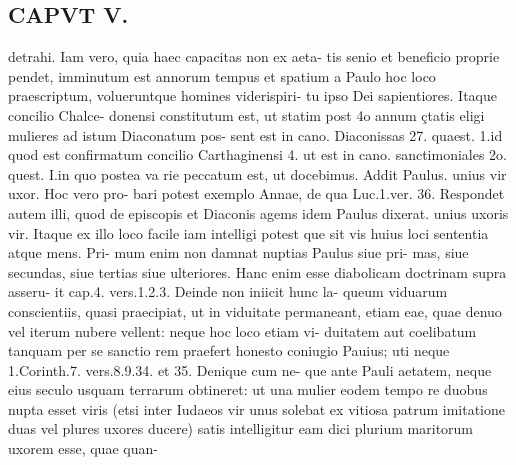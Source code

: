 \documentclass{article}
\begin{document}
\begin{pages}
\section*{CAPVT  V. }
\marginpar{[ p.27 ]}detrahi. Iam vero, quia haec capacitas non ex aeta- tis senio et beneficio proprie pendet, imminutum est annorum tempus et spatium a Paulo hoc loco praescriptum, volueruntque homines viderispiri- tu ipso Dei sapientiores. Itaque concilio Chalce- donensi constitutum est, ut statim post 4o annum çtatis eligi mulieres ad istum Diaconatum pos- sent est in cano. Diaconissas 27. quaest. 1.id quod est confirmatum concilio Carthaginensi 4. ut est in cano. sanctimoniales 2o. quest. I.in quo postea va rie peccatum est, ut docebimus. Addit Paulus. unius vir uxor. Hoc vero pro- bari potest exemplo Annae, de qua Luc.1.ver. 36. Respondet autem illi, quod de episcopis et Diaconis agems idem Paulus dixerat. unius uxoris vir. Itaque ex illo loco facile iam intelligi potest que sit vis huius loci sententia atque mens. Pri- mum enim non damnat nuptias Paulus siue pri- mas, siue secundas, siue tertias siue ulteriores. Hanc enim esse diabolicam doctrinam supra asseru- it cap.4. vers.1.2.3. Deinde non iniicit hunc la- queum viduarum conscientiis, quasi praecipiat, ut in viduitate permaneant, etiam eae, quae denuo vel iterum nubere vellent: neque hoc loco etiam vi- duitatem aut coelibatum tanquam per se sanctio rem praefert honesto coniugio Pauius; uti neque 1.Corinth.7. vers.8.9.34. et 35. Denique cum ne- que ante Pauli aetatem, neque eius seculo usquam terrarum obtineret: ut una mulier eodem tempo re duobus nupta esset viris (etsi inter Iudaeos vir unus solebat ex vitiosa patrum imitatione duas vel plures uxores ducere) satis intelligitur eam dici plurium maritorum uxorem esse, quae quan- 

\end{pages}
\end{document}
